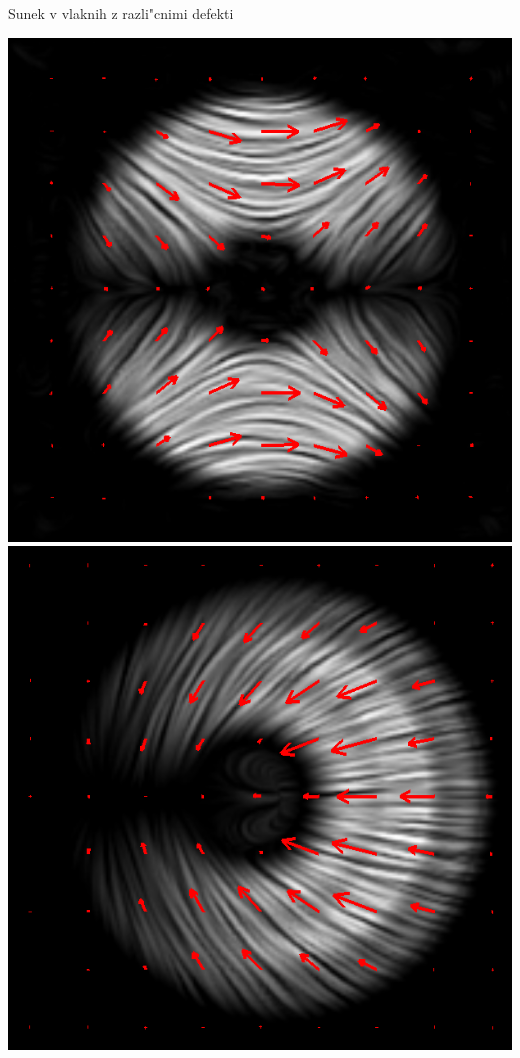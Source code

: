 \documentclass{beamer}
\begin{document}
\begin{frame}{Sunek v vlaknih z razli"cnimi defekti}

 \begin{center}
  \includegraphics[height=.35\textheight]{./Slike/licp_m1_74} \quad
  \includegraphics[height=.35\textheight]{./Slike/licp_p12_68} \quad

\end{center}
\end{frame}
\end{document}
